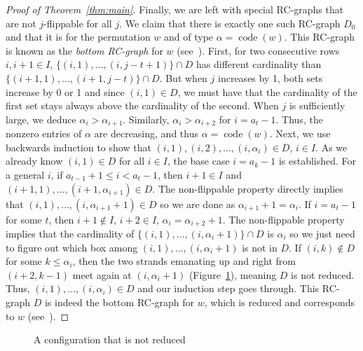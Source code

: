 \documentclass[ALCO,ThmDefs,Unicode,epreuves]{cedram}
\DeclareMathOperator{\code}{code}
\begin{document}
\begin{proof}[Proof of Theorem~\ref{thm:main}]
Finally, we are left with special RC-graphs that are not $j$-flippable for all $j$. We claim that there is exactly one such RC-graph $D_0$ and that it is for the permutation $w$ and of type $\alpha=\code(w)$. This RC-graph is known as the \emph{bottom RC-graph} for $w$ (see~\cite{bergeron1993rc}). First, for two consecutive rows $i,i+1\in I$, $\{(i,1),\ldots,(i,j-t+1)\}\cap D$ has different cardinality than $\{(i+1,1),\ldots,(i+1,j-t)\}\cap D$. But when $j$ increases by 1, both sets increase by 0 or 1 and since $(i,1)\in D$, we must have that the cardinality of the first set stays always above the cardinality of the second. When $j$ is sufficiently large, we deduce $\alpha_i>\alpha_{i+1}$. Similarly, $\alpha_i>\alpha_{i+2}$ for $i=a_t-1$. Thus, the nonzero entries of $\alpha$ are decreasing, and thus $\alpha=\code(w)$. Next, we use backwards induction to show that $(i,1),(i,2),\ldots,(i,\alpha_i)\in D$, $i\in I$. As we already know $(i,1)\in D$ for all $i\in I$, the base case $i=a_k-1$ is established. For a general $i$, if $a_{t-1}+1\leq i< a_t-1$, then $i+1\in I$ and $(i+1,1),\ldots,(i+1,\alpha_{i+1})\in D$. The non-flippable property directly implies that $(i,1),\ldots,(i,\alpha_{i+1}+1)\in D$ so we are done as $\alpha_{i+1}+1=\alpha_i$. If $i=a_t-1$ for some $t$, then $i+1\notin I$, $i+2\in I$, $\alpha_{i}=\alpha_{i+2}+1$. The non-flippable property implies that the cardinality of $\{(i,1),\ldots,(i,\alpha_i+1)\}\cap D$ is $\alpha_i$ so we just need to figure out which box among $(i,1),\ldots,(i,\alpha_i+1)$ is not in $D$. If $(i,k)\notin D$ for some $k\leq\alpha_i$, then the two strands emanating up and right from $(i+2,k-1)$ meet again at $(i,\alpha_{i}+1)$ (Figure~\ref{fig:indNon}), meaning $D$ is not reduced. Thus, $(i,1),\ldots,(i,\alpha_i)\in D$ and our induction step goes through. This RC-graph $D$ is indeed the bottom RC-graph for $w$, which is reduced and corresponds to $w$ (see~\cite{bergeron1993rc}).
\end{proof}

\begin{figure}[h!]
\centering
{}
\caption{A configuration that is not reduced}
\label{fig:indNon}
\end{figure}
\end{document}
